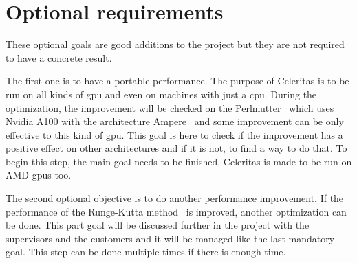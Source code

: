 \section{Optional requirements}
\label{ch:introduction:optional-requirements}

These optional goals are good additions to the project but they are not
required to have a concrete result.

The first one is to have a portable performance.
The purpose of Celeritas is to be run on all kinds of \acrshort{gpu} and even on machines with just a \acrshort{cpu}.
During the optimization, the improvement will be checked on the Perlmutter~\cite{Perlmutter} which uses Nvidia A100 with the architecture Ampere~\cite{ampere} and some improvement can be only effective to this kind of \acrshort{gpu}.
This goal is here to check if the improvement has a positive effect on other architectures and if it is not, to find a way to do that.
To begin this step, the main goal needs to be finished.
Celeritas is made to be run on AMD \acrshort{gpu}s too.

The second optional objective is to do another performance improvement.
If the performance of the Runge-Kutta method~\cite{Runge-Kutta-methods} is improved, another optimization can be done.
This part goal will be discussed further in the project with the supervisors and the customers and it will be managed like the last mandatory goal.
This step can be done multiple times if there is enough time.
